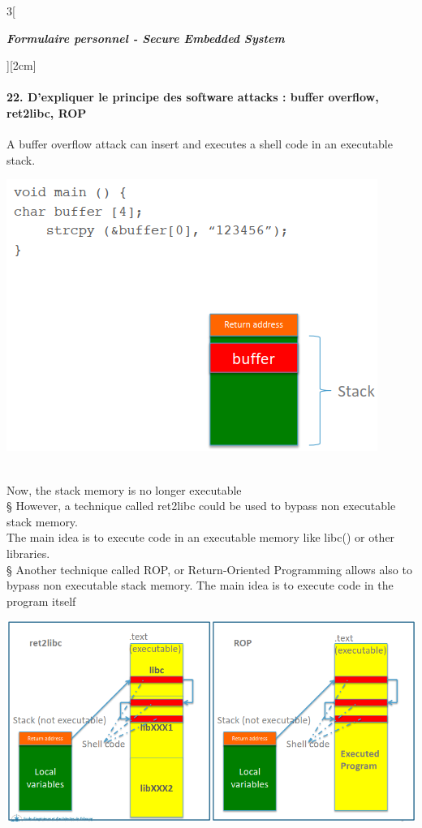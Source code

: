 \begin{multicols}{3}[\centerline{ \large\em \textbf{Formulaire personnel - Secure Embedded System}}][2cm]
\paragraph*{22. D’expliquer le principe des software attacks : buffer overflow, ret2libc, ROP\\}
A buffer overflow attack can insert and executes a shell code in an executable
stack.\\
\begin{minipage}{\linewidth}
	\centering
    \includegraphics[width =0.8\columnwidth]{images/8.png}
\end{minipage}\\
Now, the stack memory is no longer executable\\
§ However, a technique called ret2libc could be used to bypass non executable stack memory.\\
The main idea is to execute code in an executable memory like libc() or other libraries.\\
§ Another technique called ROP, or Return-Oriented Programming allows also to bypass non executable stack memory. The main idea is to execute code in the program itself\\
\begin{minipage}{\linewidth}
	\centering
    \includegraphics[width =0.8\columnwidth]{images/7.png}
\end{minipage}\\

\end{multicols}
